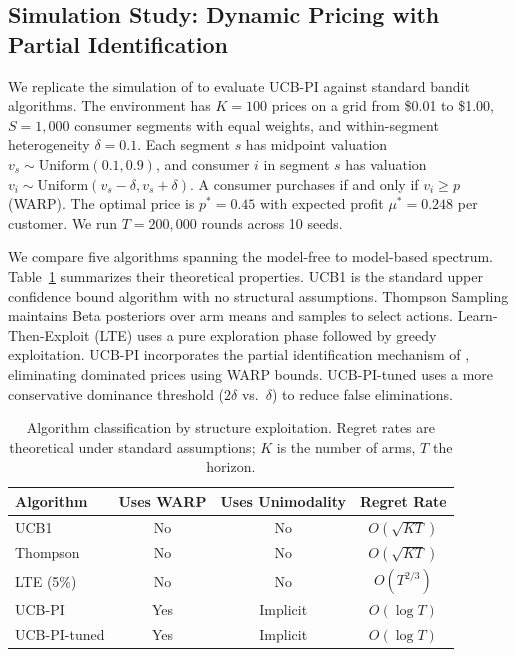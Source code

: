 \subsection{Simulation Study: Dynamic Pricing with Partial Identification}
\label{sec:bandit_sim}

We replicate the simulation of \citet{Misra2019} to evaluate UCB-PI against standard bandit algorithms. The environment has $K = 100$ prices on a grid from \$0.01 to \$1.00, $S = 1{,}000$ consumer segments with equal weights, and within-segment heterogeneity $\delta = 0.1$. Each segment $s$ has midpoint valuation $v_s \sim \mathrm{Uniform}(0.1, 0.9)$, and consumer $i$ in segment $s$ has valuation $v_i \sim \mathrm{Uniform}(v_s - \delta, v_s + \delta)$. A consumer purchases if and only if $v_i \geq p$ (WARP). The optimal price is $p^* = 0.45$ with expected profit $\mu^* = 0.248$ per customer. We run $T = 200{,}000$ rounds across 10 seeds.

We compare five algorithms spanning the model-free to model-based spectrum. Table~\ref{tab:algorithm_class} summarizes their theoretical properties. UCB1 is the standard upper confidence bound algorithm with no structural assumptions. Thompson Sampling maintains Beta posteriors over arm means and samples to select actions. Learn-Then-Exploit (LTE) uses a pure exploration phase followed by greedy exploitation. UCB-PI incorporates the partial identification mechanism of \citet{Misra2019}, eliminating dominated prices using WARP bounds. UCB-PI-tuned uses a more conservative dominance threshold ($2\delta$ vs.\ $\delta$) to reduce false eliminations.

\begin{table}[!htbp]
\centering
\caption{Algorithm classification by structure exploitation. Regret rates are theoretical under standard assumptions; $K$ is the number of arms, $T$ the horizon.}
\label{tab:algorithm_class}
\begin{tabular}{lccc}
\toprule
Algorithm & Uses WARP & Uses Unimodality & Regret Rate \\
\midrule
UCB1 & No & No & $O(\sqrt{KT})$ \\
Thompson & No & No & $O(\sqrt{KT})$ \\
LTE (5\%) & No & No & $O(T^{2/3})$ \\
UCB-PI & Yes & Implicit & $O(\log T)$ \\
UCB-PI-tuned & Yes & Implicit & $O(\log T)$ \\
\bottomrule
\end{tabular}
\end{table}

